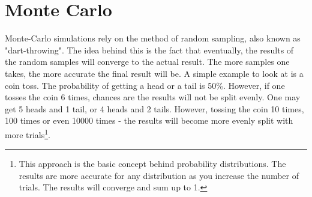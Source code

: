 \section{Monte Carlo}
\label{sec:mcarlo}

Monte-Carlo simulations rely on the method of random sampling, also known as "dart-throwing". The idea behind this is the fact that eventually, the results of the random samples will converge to the actual result. The more samples one takes, the more accurate the final result will be. A simple example to look at is a coin toss. The probability of getting a head or a tail is 50\%. However, if one tosses the coin 6 times, chances are the results will not be split evenly. One may get 5 heads and 1 tail, or 4 heads and 2 tails. However, tossing the coin 10 times, 100 times or even 10000 times - the results will become more evenly split with more trials\footnote{This approach is the basic concept behind probability distributions. The results are more accurate for any distribution as you increase the number of trials. The results will converge and sum up to 1.}.